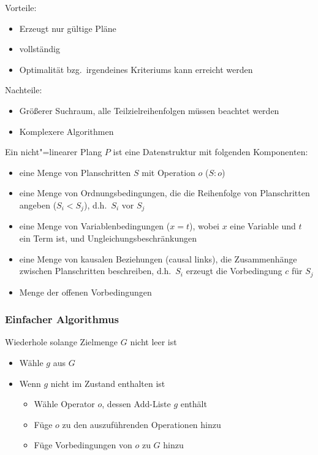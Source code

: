 Vorteile:
\begin{itemize}
	\item Erzeugt nur gültige Pläne
	\item vollständig
	\item Optimalität bzg.\ irgendeines Kriteriums kann erreicht werden
\end{itemize}
Nachteile:
\begin{itemize}
	\item Größerer Suchraum, alle Teilzielreihenfolgen müssen beachtet werden
	\item Komplexere Algorithmen
\end{itemize}

Ein nicht"=linearer Plang $P$ ist eine Datenstruktur mit folgenden Komponenten:
\begin{itemize}
	\item eine Menge von Planschritten $S$ mit Operation $o$ ($S:o$)
	\item eine Menge von Ordnungsbedingungen, die die Reihenfolge von Planschritten angeben ($S_i < S_j$), d.h.\ \glqq $S_i$ vor $S_j$ \grqq
	\item eine Menge von Variablenbedingungen ($x=t$), wobei $x$ eine Variable und $t$ ein Term ist, und Ungleichungsbeschränkungen
	\item eine Menge von kausalen Beziehungen (causal links), die Zusammenhänge zwischen Planschritten beschreiben, d.h.\ $S_i$ erzeugt die Vorbedingung $c$ für $S_j$
	\item Menge der offenen Vorbedingungen
\end{itemize}

\subsubsection{Einfacher Algorithmus}
Wiederhole solange Zielmenge $G$ nicht leer ist
\begin{itemize}
	\item Wähle $g$ aus $G$
	\item Wenn $g$ nicht im Zustand enthalten ist
	\begin{itemize}
		\item Wähle Operator $o$, dessen Add-Liste $g$ enthält
		\item Füge $o$ zu den auszuführenden Operationen hinzu
		\item Füge Vorbedingungen von $o$ zu $G$ hinzu
	\end{itemize}
\end{itemize}


